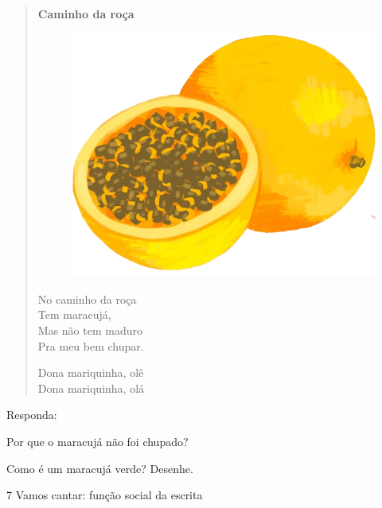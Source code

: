\begin{myquote}
\begin{verse}
\textbf{Caminho da roça}
\begin{figure}[H]
\centering
\includegraphics[width=.35\textwidth]{media/image197.png}
\end{figure}
\vspace{-2em}
No caminho da roça\\
Tem maracujá,\\
Mas não tem maduro\\
Pra meu bem chupar.

Dona mariquinha, olê\\
Dona mariquinha, olá
\end{verse}

\end{myquote}

Responda:

\begin{escolha}
\item Por que o maracujá não foi chupado?\\

\item Como é um maracujá verde? Desenhe.

\begin{mdframed}[linewidth=2pt,linecolor=salmao,roundcorner=10pt]
\vspace{4cm}
\end{mdframed}
\end{escolha}

\num{7} Vamos cantar: função social da escrita



